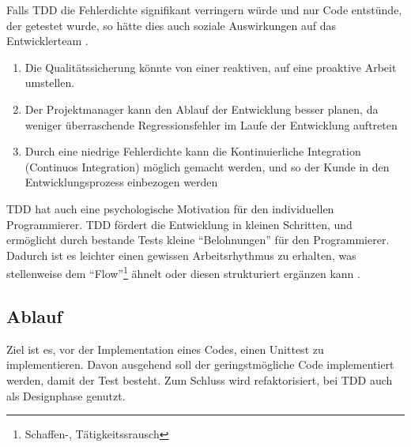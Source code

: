   Falls TDD die Fehlerdichte signifikant verringern würde und nur Code entstünde, der getestet wurde, so hätte dies auch soziale Auswirkungen auf das Entwicklerteam \citep[S. x]{beck_test_2002}. 
  \begin{enumerate}
   \item Die Qualitätssicherung könnte von einer reaktiven, auf eine proaktive Arbeit umstellen.
   \item Der Projektmanager kann den Ablauf der Entwicklung besser planen, da weniger überraschende Regressionsfehler im Laufe der Entwicklung auftreten
   \item Durch eine niedrige Fehlerdichte kann die Kontinuierliche Integration (Continuos Integration) möglich gemacht werden, und so der Kunde in den Entwicklungsprozess einbezogen werden
  \end{enumerate}
 
  TDD hat auch eine psychologische Motivation für den individuellen Programmierer.
  TDD fördert die Entwicklung in kleinen Schritten, und ermöglicht durch bestande Tests kleine "`Belohnungen"' für den Programmierer. Dadurch ist es leichter einen gewissen Arbeitsrhythmus zu erhalten, was stellenweise dem "`Flow"'\footnote{Schaffen-, Tätigkeitssrausch}  ähnelt oder diesen strukturiert ergänzen kann \citep{roger_brown_test_2008}.
  
\subsection{Ablauf}
  Ziel ist es, vor der Implementation eines Codes, einen Unittest zu implementieren. Davon ausgehend soll der geringstmögliche Code implementiert werden, damit der Test besteht. Zum Schluss wird refaktorisiert, bei TDD auch als Designphase genutzt.
  
